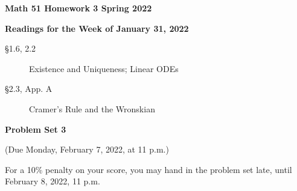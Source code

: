 \documentclass[12pt]{amsart}
\begin{document}
\thispagestyle{empty}
\noindent
\textbf{Math 51 \hfill Homework 3 \hfill Spring 2022}

\bigskip
\bigskip

\centerline{\textbf{Readings for the Week of January 31, 2022}}

\medskip
\begin{description}
\item[\S 1.6, 2.2] Existence and Uniqueness; Linear ODEs
\item[\S 2.3, App. A] Cramer’s Rule and the Wronskian
\end{description}

\bigskip
\noindent
\centerline{\textbf{Problem Set 3}}
\centerline{(Due Monday, February 7, 2022, at 11 p.m.)}

\medskip

\noindent
For a 10\% penalty on your score, you may hand in the problem set late, until February 8, 2022, 11 p.m.
\end{document}
